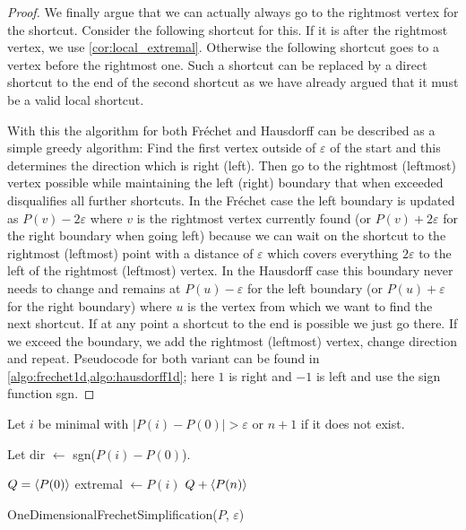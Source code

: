 \begin{proof}
	We finally argue that we can actually always go to the rightmost vertex for the shortcut. Consider the following shortcut for this. If it is after the rightmost vertex, we use \cref{cor:local_extremal}. Otherwise the following shortcut goes to a vertex before the rightmost one. Such a shortcut can be replaced by a direct shortcut to the end of the second shortcut as we have already argued that it must be a valid local shortcut.

	With this the algorithm for both Fréchet and Hausdorff can be described as a simple greedy algorithm: Find the first vertex outside of \(\varepsilon\) of the start and this determines the direction which is right (left). Then go to the rightmost (leftmost) vertex possible while maintaining the left (right) boundary that when exceeded disqualifies all further shortcuts. In the Fréchet case the left boundary is updated as \(P(v) - 2\varepsilon\) where \(v\) is the rightmost vertex currently found (or \(P(v) + 2\varepsilon\) for the right boundary when going left) because we can wait on the shortcut to the rightmost (leftmost) point with a distance of \(\varepsilon\) which covers everything \(2\varepsilon\) to the left of the rightmost (leftmost) vertex. In the Hausdorff case this boundary never needs to change and remains at \(P(u) - \varepsilon\) for the left boundary (or \(P(u) + \varepsilon\) for the right boundary) where \(u\) is the vertex from which we want to find the next shortcut. If at any point a shortcut to the end is possible we just go there. If we exceed the boundary, we add the rightmost (leftmost) vertex, change direction and repeat. Pseudocode for both variant can be found in \cref{algo:frechet1d,algo:hausdorff1d}; here \(1\) is right and \(-1\) is left and use the sign function sgn. 
\end{proof}

\begin{algorithm}[htb]
  \DontPrintSemicolon
  \BlankLine
	Let \(i\) be minimal with \(|P(i)-P(0)| > \varepsilon\) or \(n+1\) if it does not exist. 

	Let dir \(\gets\) sgn(\(P(i)-P(0)\)).

	\(Q = \left\langle P(0)\right\rangle\)\;
	extremal \(\gets P(i)\)\;
	\Return \(Q + \left\langle P(n)\right\rangle\)
	\caption{OneDimensionalFrechetSimplification(\(P\), \(\varepsilon\))}
  \label{algo:frechet1d}
\end{algorithm}

